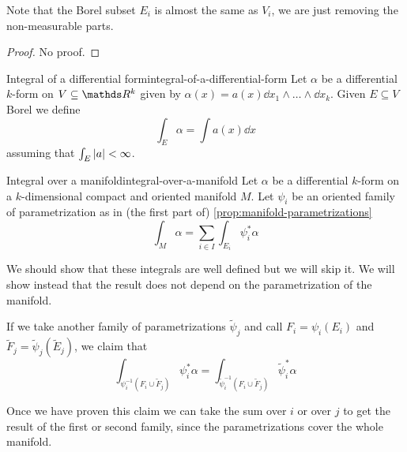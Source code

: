 \documentclass[12pt]{extarticle}
\begin{document}
Note that the Borel subset $E_i$ is almost the same as $V_i$, we are just removing the
non-measurable parts.

\begin{proof}
	No proof.
\end{proof}

\begin{definition}{Integral of a differential form}{integral-of-a-differential-form}
	Let $\alpha$ be a differential $k$-form on $V \subseteq \R^k$ given by
	$\alpha(x) = a(x) \dd x_1 \land \dots \land \dd x_k$.
	Given $E \subseteq V$ Borel we define
	\begin{equation}
		\int_E \alpha = \int a(x) \dd x
	\end{equation}
	assuming that $\int_E \abs{a} < \infty$.
\end{definition}

\begin{definition}{Integral over a manifold}{integral-over-a-manifold}
	Let $\alpha$ be a differential $k$-form on a $k$-dimensional compact and oriented manifold $M$.
	Let $\psi_i$ be an oriented family of parametrization as in (the first part of)
	\cref{prop:manifold-parametrizations}
	\begin{equation}
		\int_M \alpha = \sum_{i \in I} \int_{E_i} \psi_i^*\alpha
	\end{equation}
\end{definition}

We should show that these integrals are well defined but we will skip it.
We will show instead that the result does not depend on the parametrization of the manifold.
\begin{lemma}{}{}
	If we take another family of parametrizations $\tilde \psi_j$ and call $F_i = \psi_i(E_i)$
	and $\tilde F_j = \tilde \psi_j(\tilde E_j)$, we claim that
	\begin{equation}
		\int_{\psi_i^{-1}(F_i \cup \tilde F_j)} \psi^*_i \alpha =
		\int_{\tilde \psi_i^{-1}(F_i \cup \tilde F_j)} \tilde \psi^*_i \alpha
	\end{equation}
\end{lemma}

Once we have proven this claim we can take the sum over $i$ or over $j$ to get the result of the
first or second family, since the parametrizations cover the whole manifold.
\end{document}
